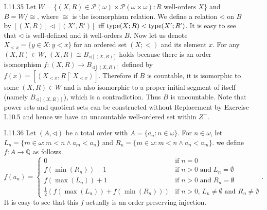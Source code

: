 \documentclass[12pt]{article}
\begin{document}
\begin{customthm}{I.11.35}
  Let $W=\{(X,R)\in\mathcal{P}(\omega)\times\mathcal{P}(\omega\times\omega):R\text{ well-orders }X\}$ and $B=W/\cong$, where $\cong$ is the isomorphism relation. We define a relation $\triangleleft$ on $B$ by $[(X,R)]\triangleleft[(X',R')]$ iff $\mathop{\mathrm{type}}(X;R)<\mathop{\mathrm{type}}(X';R')$. It is easy to see that $\triangleleft$ is well-defined and it well-orders $B$. Now let us denote $X_{<x}=\{y\in X:y<x\}$ for an ordered set $(X;<)$ and its element $x$. For any $(X,R)\in W$, $(X,R)\cong B_{\triangleleft[(X,R)]}$ holds because there is an order isomorphism $f:(X,R)\rightarrow B_{\triangleleft[(X,R)]}$ defined by $f(x)=[(X_{<x},R\upharpoonright X_{<x})]$. Therefore if $B$ is countable, it is isomorphic to some $(X,R)\in W$ and is also isomorphic to a proper initial segment of itself (namely $B_{\triangleleft[(X,R)]}$), which is a contradiction. Thus $B$ is uncountable. Note that power sets and quotient sets can be constructed without Replacement by Exercise I.10.5 and hence we have an uncountable well-ordered set within $Z^-$.
\end{customthm}

\begin{customthm}{I.11.36}
  Let $(A,\triangleleft)$ be a total order with $A=\{a_n:n\in\omega\}$. For $n\in\omega$, let $L_n=\{m\in\omega:m<n\wedge a_m<a_n\}$ and $R_n=\{m\in\omega:m<n\wedge a_n<a_m\}$. we define $f:A\rightarrow\mathbb{Q}$ as follows.
  \[
    f(a_n)=
    \begin{cases}
      0 & \text{if } n=0 \\
      f(\min(R_n))-1 & \text{if } n>0 \text{ and } L_n=\emptyset \\
      f(\max(L_n))+1 & \text{if } n>0 \text{ and } R_n=\emptyset \\
      \frac{1}{2}(f(\max(L_n))+f(\min(R_n))) & \text{if } n>0 \text{, } L_n\neq\emptyset \text{ and } R_n\neq\emptyset
    \end{cases}.
  \]
  It is easy to see that this $f$ actually is an order-preserving injection.
\end{customthm}
\end{document}
